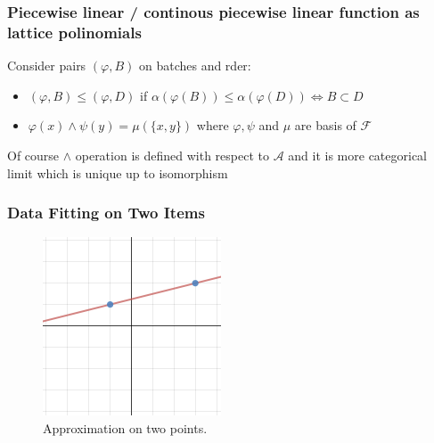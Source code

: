 \documentclass{beamer}
\newcommand {\FF}                         {\mathcal{F}}
\newcommand {\A}                          {\mathcal{A}}
\newcommand {\f}                          {\varphi}
\newcommand {\p}                          {\psi}
\newcommand {\m}                          {\mu}
\begin{document}
\begin{frame}
    \frametitle{Piecewise linear / continous piecewise linear function as lattice polinomials}
    Consider pairs $(\f, B)$ on batches and rder:
    \begin{itemize}
        \item $(\f, B) \le (\f, D)$ if $\alpha(\f(B)) \le \alpha(\f(D)) \iff B \subset D$
        \item $\f(x) \land \p(y) = \m(\{x, y\})$ where $\f, \p$ and $\m$ are basis of $\FF$ 
    \end{itemize}
    Of course $\land$ operation is defined with respect to $\A$ and it is more categorical 
    limit which is unique up to isomorphism
\end{frame}

\begin{frame}
    \frametitle{Data Fitting on Two Items}
    \begin{figure}
        \includegraphics[width=\linewidth]{linear_two_1.png}
        \caption{Approximation on two points.}
        \label{fig:lintwo}
    \end{figure}
\end{frame}
\end{document}
